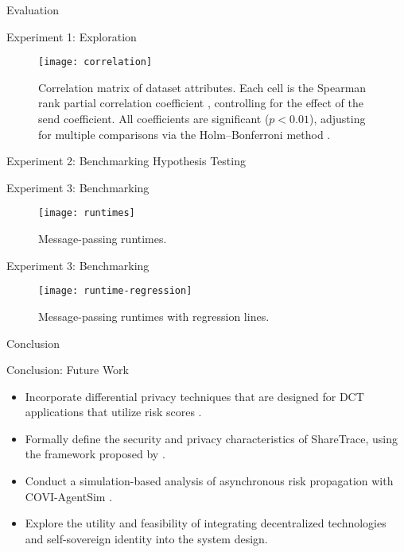 \documentclass[11pt]{beamer}
\begin{document}
\begin{section}{Evaluation}
\begin{frame}{Experiment 1: Exploration}
\begin{figure}
  \centering
  \texttt{[image: correlation]}
  \caption[Correlation matrix of dataset attributes]{Correlation matrix of dataset attributes. Each cell is the Spearman rank partial correlation coefficient \citep{Spearman1904}, controlling for the effect of the send coefficient. All coefficients are significant ($p < 0.01$), adjusting for multiple comparisons via the Holm–Bonferroni method \citep{Holm1979}.}
\end{figure}
\end{frame}

\begin{frame}{Experiment 2: Benchmarking Hypothesis Testing}
\end{frame}

\begin{frame}{Experiment 3: Benchmarking}
\begin{figure}
  \centering
  \texttt{[image: runtimes]}
  \caption[Message-passing runtimes]{Message-passing runtimes.}
\end{figure}
\end{frame}

\begin{frame}{Experiment 3: Benchmarking}
\begin{figure}
  \centering
  \texttt{[image: runtime-regression]}
  \caption[Message-passing runtimes with regression lines]{Message-passing runtimes with regression lines.}
\end{figure}
\end{frame}

\end{section}

\begin{section}{Conclusion}

\begin{frame}{Conclusion: Future Work}
\begin{itemize}
  \item Incorporate differential privacy techniques that are designed for DCT applications that utilize risk scores \citep{Romijnders2024}.
  \pause
  \item Formally define the security and privacy characteristics of ShareTrace, using the framework proposed by \citet{Kuhn2021}.
  \pause
  \item Conduct a simulation-based analysis of asynchronous risk propagation with COVI-AgentSim \citep{Gupta2020}.
  \pause
  \item Explore the utility and feasibility of integrating decentralized technologies \citep{Troncoso2017, Trautwein2022, Shi2024, Keizer2024} and self-sovereign identity \citep{Preukschat2021} into the system design.
\end{itemize}
\end{frame}

\end{section}
\end{document}
